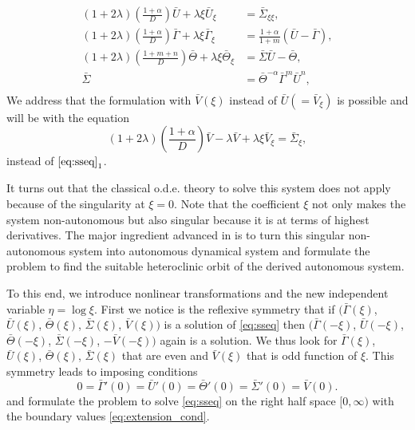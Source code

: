 \documentclass[a4paper,11pt]{article}
\def\bG{{\bar{\Gamma}}}
\def\bV{{\bar{V}}}
\def\bTh{{\bar{\Theta}}}
\def\bS{{\bar{\Sigma}}}
\def\bU{{\bar{U}}}
\theoremstyle{remark}
\begin{document}
\begin{equation}\label{eq:sseq}
\begin{aligned}
 (1+2 \lambda) \left(\frac{1 + \alpha}{D}\right) \bU + \lambda \xi \bU_\xi &= \bS_{\xi\xi},\\
 (1+2 \lambda) \left(\frac{1 + \alpha}{D}\right) \bG + \lambda \xi \bG_\xi&=\frac{1+ \alpha}{1+m}(\bU - \bG),\\
 (1+2 \lambda) \left(\frac{1 + m+n}{D}\right) \bTh + \lambda \xi \bTh_\xi&=\bS\bU - \bTh,\\
 \bS &= \bTh^ {- \alpha} \bG ^m \bU ^n,\\
\end{aligned}
\end{equation}
We address that the formulation with $\bV(\xi)$ instead of $\bU(=\bV_\xi)$ is possible and will be with the equation
$$ (1+2 \lambda) \left(\frac{1 + \alpha}{D}\right) \bV - \lambda \bV + \lambda \xi \bV_\xi=\bS_\xi,$$
instead of $\eqref{eq:sseq}_1$.

It turns out that the classical o.d.e. theory to solve this system does not apply because of the singularity at $\xi=0$. Note that the coefficient $\xi$ not only makes the system non-autonomous but also singular because it is at terms of highest derivatives. The major ingredient advanced in \cite{KOT14,KLT17} is to turn this singular non-autonomous system into autonomous dynamical system and formulate the problem to find the suitable heteroclinic orbit of the derived autonomous system.

To this end, we introduce nonlinear transformations and the new independent variable $\eta = \log\xi$. First we notice is the reflexive symmetry that if $\big(\bG(\xi)$, $\bU(\xi)$, $\bTh(\xi)$, $\bS(\xi)$, $\bV(\xi)\big)$ is a solution of \eqref{eq:sseq} then $\big(\bG(-\xi)$, $\bU(-\xi)$, $\bTh(-\xi)$, $\bS(-\xi)$, $-\bV(-\xi)\big)$ again is a solution. We thus look for $\bG(\xi)$, $\bU(\xi)$, $\bTh(\xi)$, $\bS(\xi)$ that are even and $\bV(\xi)$ that is odd function of $\xi$. This symmetry leads to imposing conditions
\begin{equation} \label{eq:extension_cond}
 0=\bG'(0)=\bU'(0)=\bTh'(0)=\bS'(0)=\bV(0).
\end{equation}
and formulate the problem to solve \eqref{eq:sseq} on the right half space $[0,\infty)$ with the boundary values \eqref{eq:extension_cond}.
\end{document}
